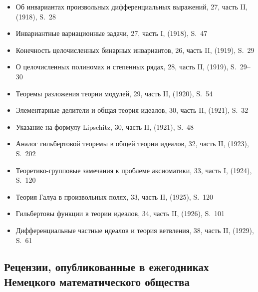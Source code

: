 \documentclass[11pt]{article}
\begin{document}
\begin{itemize}[leftmargin=1.5em,itemsep=0.2em]
\item Об инвариантах произвольных дифференциальных выражений, 27, часть II, (1918), S.~28
\item Инвариантные вариационные задачи, 27, часть I, (1918), S.~47
\item Конечность целочисленных бинарных инвариантов, 26, часть II, (1919), S.~29
\item О целочисленных полиномах и степенных рядах, 28, часть II, (1919), S.~29--30
\item Теоремы разложения теории модулей, 29, часть II, (1920), S.~54
\item Элементарные делители и общая теория идеалов, 30, часть II, (1921), S.~32
\item Указание на формулу Lipschitz, 30, часть II, (1921), S.~48
\item Аналог гильбертовой теоремы в общей теории идеалов, 32, часть II, (1923), S.~202
\item Теоретико-групповые замечания к проблеме аксиоматики, 33, часть I, (1924), S.~120
\item Теория Галуа в произвольных полях, 33, часть II, (1925), S.~120
\item Гильбертовы функции в теории идеалов, 34, часть II, (1926), S.~101
\item Дифференциальные частные идеалов и теория ветвления, 38, часть II, (1929), S.~61
\end{itemize}

\subsection*{Рецензии, опубликованные в ежегодниках Немецкого математического общества}
\end{document}
